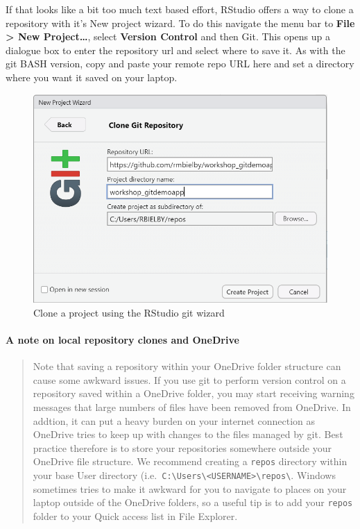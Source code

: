 \documentclass[
  12pt,
]{article}
\begin{document}
If that looks like a bit too much text based effort, RStudio offers a
way to clone a repository with it's New project wizard. To do this
navigate the menu bar to \textbf{File \textgreater{} New
Project\ldots{}}, select \textbf{Version Control} and then Git. This
opens up a dialogue box to enter the repository url and select where to
save it. As with the git BASH version, copy and paste your remote repo
URL here and set a directory where you want it saved on your laptop.

\begin{figure}
\includegraphics[width=0.6\linewidth]{images/gitdemo/gitdemo-RStudio_OpenProj_wizard} \caption{Clone a project using the RStudio git wizard}\label{fig:unnamed-chunk-7}
\end{figure}

\hypertarget{a-note-on-local-repository-clones-and-onedrive}{%
\paragraph{A note on local repository clones and
OneDrive}\label{a-note-on-local-repository-clones-and-onedrive}}

\begin{quote}
Note that saving a repository within your OneDrive folder structure can
cause some awkward issues. If you use git to perform version control on
a repository saved within a OneDrive folder, you may start receiving
warning messages that large numbers of files have been removed from
OneDrive. In addtion, it can put a heavy burden on your internet
connection as OneDrive tries to keep up with changes to the files
managed by git. Best practice therefore is to store your repositories
somewhere outside your OneDrive file structure. We recommend creating a
\texttt{repos} directory within your base User directory
(i.e.~\texttt{C:\textbackslash{}Users\textbackslash{}\textless{}USERNAME\textgreater{}\textbackslash{}repos\textbackslash{}}.
Windows sometimes tries to make it awkward for you to navigate to places
on your laptop outside of the OneDrive folders, so a useful tip is to
add your \texttt{repos} folder to your Quick access list in File
Explorer.
\end{quote}
\end{document}
